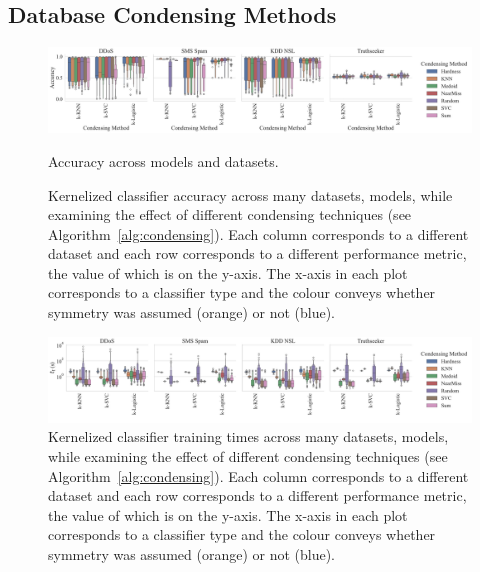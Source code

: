 \documentclass[conference]{IEEEtran}
\begin{document}
\subsection{Database Condensing Methods}

\begin{figure}[t]
    \centering
    \includegraphics[width=\textwidth]{figs/combined/condensing_methods_vs_accuracy.pdf}
    \caption{Accuracy across models and datasets.}
    \label{fig:cond_acc}
    \caption{Kernelized classifier accuracy across many datasets, models, while examining the effect of different condensing techniques (see Algorithm~\ref{alg:condensing}). Each column corresponds to a different dataset and each row corresponds to a different performance metric, the value of which is on the y-axis. The x-axis in each plot corresponds to a classifier type and the colour conveys whether symmetry was assumed (orange) or not (blue).}
    \label{fig:condensing_summary}
\end{figure}

\begin{figure}
    \centering
    \includegraphics[width=\textwidth]{figs/combined/condensing_methods_vs_train_time.pdf}
    \caption{Kernelized classifier training times across many datasets, models, while examining the effect of different condensing techniques (see Algorithm~\ref{alg:condensing}). Each column corresponds to a different dataset and each row corresponds to a different performance metric, the value of which is on the y-axis. The x-axis in each plot corresponds to a classifier type and the colour conveys whether symmetry was assumed (orange) or not (blue).}
    \label{fig:cond_train_time}
\end{figure}

\end{document}
